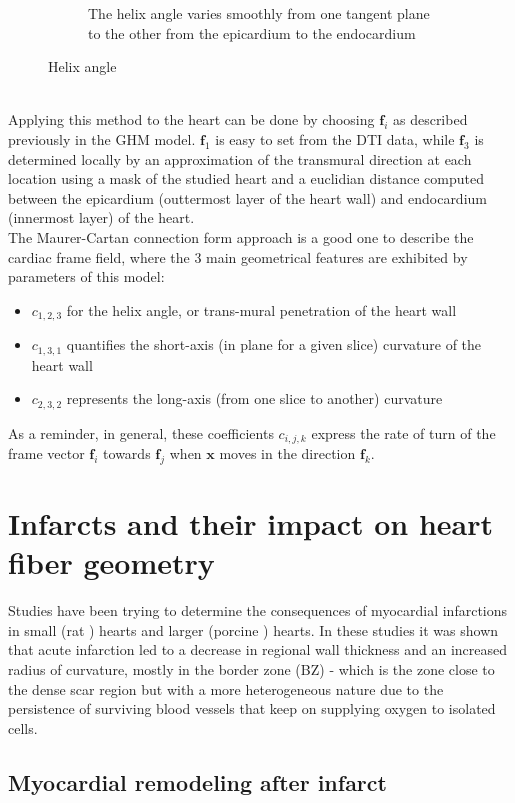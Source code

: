 \begin{figure}[!h]
\begin{subfigure}[t]{.48\textwidth}
        \caption{The helix angle varies smoothly from one tangent plane to the other from the epicardium to the endocardium}
        \label{fig:helix_angle}
    \end{subfigure}
    \caption{Helix angle}
\end{figure}
\\
Applying this method to the heart can be done by choosing $\mathbf{f}_i$ as described previously in the GHM model. $\mathbf{f}_1$ is easy to set from the DTI data, while $\mathbf{f}_3$ is determined locally by an approximation of the transmural direction at each location using a mask of the studied heart and a euclidian distance computed between the epicardium (outtermost layer of the heart wall) and endocardium (innermost layer) of the heart.\\
The Maurer-Cartan connection form approach is a good one to describe the cardiac frame field, where the 3 main geometrical features are exhibited by parameters of this model:
\begin{itemize}
    \item $c_{1,2,3}$ for the helix angle, or trans-mural penetration of the heart wall
    \item $c_{1,3,1}$ quantifies the short-axis (in plane for a given slice) curvature of the heart wall
    \item $c_{2,3,2}$ represents the long-axis (from one slice to another) curvature
\end{itemize}
As a reminder, in general, these coefficients $c_{i,j,k}$ express the rate of turn of the frame vector $\mathbf{f}_i$ towards $\mathbf{f}_j$ when $\mathbf{x}$ moves in the direction $\mathbf{f}_k$.

\section{Infarcts and their impact on heart fiber geometry}

Studies have been trying to determine the consequences of myocardial infarctions in small (rat \cite{weisman1985global}) hearts and larger (porcine \cite{wu2007mr, mediamihaela}) hearts. In these studies it was shown that acute infarction led to a decrease in regional wall thickness and an increased radius of curvature, mostly in the border zone (BZ) - which is the zone close to the dense scar region but with a more heterogeneous nature due to the persistence of surviving blood vessels that keep on supplying oxygen to isolated cells.

\subsection{Myocardial remodeling after infarct}


